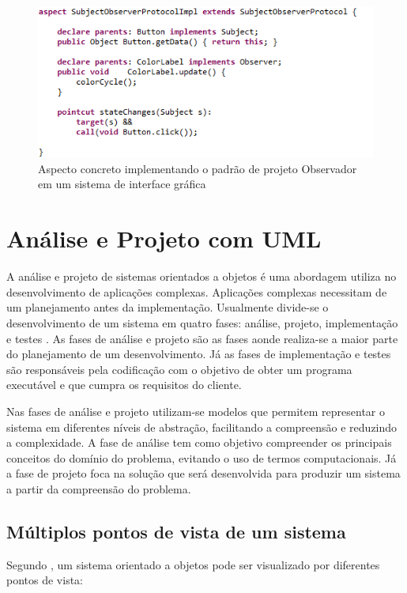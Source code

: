 \begin{figure}
	\centering
	\includegraphics{img/aspects_observer_2.png}
	\caption{Aspecto concreto implementando o padrão de projeto Observador em um sistema de
	interface gráfica}\label{fig:aspects_observer_2}
\end{figure}

\section{Análise e Projeto com UML}

A análise e projeto de sistemas orientados a objetos é uma abordagem utiliza no desenvolvimento de aplicações complexas. 
Aplicações complexas necessitam de um planejamento antes da implementação. Usualmente divide-se o desenvolvimento de
um sistema em quatro fases: análise, projeto, implementação e testes
\cite{pressman:01}. As fases de análise e projeto são as fases aonde realiza-se 
a maior parte do planejamento de um desenvolvimento. Já as fases de
implementação e testes são responsáveis pela codificação com o objetivo de obter
um programa executável e que cumpra os requisitos do cliente. 

Nas fases de análise e projeto utilizam-se modelos que permitem representar o
sistema em diferentes níveis de abstração, facilitando a compreensão e reduzindo
a complexidade. A fase de análise tem como objetivo compreender os principais conceitos
do domínio do problema, evitando o uso de termos computacionais. Já a fase de
projeto foca na solução que será desenvolvida para produzir um sistema a partir
da compreensão do problema. 

\subsection{Múltiplos pontos de vista de um sistema}

Segundo \cite{silva:07}, um sistema orientado a objetos pode ser visualizado por
diferentes pontos de vista:

